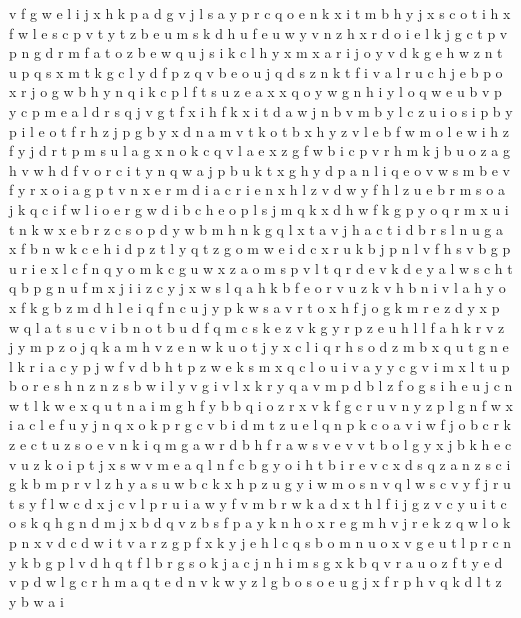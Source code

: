 \documentclass{article}
\begin{document}
v f g w e l i j x h k p a
d g v j l s a y p r c q o e n k x i t m b h
y j x s c o t i
h x f w l e s c p v t y
t z b e u m s k d
h u f e
u w y v n z h x r d o i e l k j g c t p
v p n g d r m f a t o z b e w q u j s i k c l h y x
m x a r i j o y v d k g e h w z n t u p q s
x m t k g c l y d f p z q v b e o u j
q d s z n k t f i v a l r u c h j e b p o x
r j o g w b h y n q i k c p l f t s u z e a x
x q o y w g n
h i y l o q w e u b v p
y c p m e a l d r s q j v g t f x i h
f k x i t d a w j n b v
m b y l c z u i o s
i p
b y p i
l e o t
f r h z j p g b y x d n a m v t
k o t b x h y z v l e
b f w m o
l
e w i h z f y j d r t p m s u l a g x n o k c q v
l a e x z g f w b i c p v r h m
k j b u o z a g h v w
h d f v o r c i t y n q w a j p b u
k t x g h y d p a n l i q e o v w s m b
e v f y r x o i a g
p t
v n x e r
m d i a c r
i e n x
h l z
v d w y f h l z u e b r m s o a j k q c i
f w l i o e
r g w d i b c h e o p l s j m q k x
d h w f k g p y o q r m x u i t
n k w x e b r
z c s o p d y w b m h n k g q l x t a
v j h a c t i d b r s l n u g
a x f b n w k c e h i d p z t l
y q t z g o m w e i d c x r u k b j p n l v f h s
v b g p u r i e x l c f n q y o m
k
c g u w x z a o m s p v l t q r d e
v k d e y a l w s c h t q b p g n u f m x j i
i z c y j x w s l q a h k b f e o r v u
z k v h b
n i v l a h y o x f k
g b z m d h l e i q f n c u j y p k w s a v r t o x
h f j o g k m r e z d y x p w q l a t s u c v i b n
o t b u d f q m c s k e
z
v k g y r p z e u h l
l f a h k r v z j y m
p z o j q k a m
h v z e n w k u o t j y x c l i q r
h s o d z m b x q u t g n e l k r i a c y p j w f v
d b h t p z w e k s m x q c l o u i v a y
y c g v i m x l t u p b o r e s h n z
n z s b w i l y v g
i
v l
x k r y q a v m p d b l z f o g s i h e u j c n w t
l k w e x q u t n a i m g h f y b
b q i o z r x v k f g c
r u v n y z p l
g n f w x i a c
l e f u y j n q x o k p r g c v b i d m t
z u e l q n p k c o a v
i w f j o b c r k z e
c t u z s o e v n k i q m g a w r d b h f
r a w s v e
v
v t b o
l g y x j b k h e c v
u z k o i p t j x s w v m e a q l n f c b g y
o
i h t
b i r e v c x d s q z a
n z s c i g k
b m p r v l z h y a s u w
b c k x h p z u g y i w m o s n v q l
w s c
v y f j r u t s
y f l
w c
d x j c v l p r u i a w y f
v m
b r w k a d x t h l f i j g z v c y
u i t c o s k q h g n d m j
x b
d q v z b s f p a y k n h o x r e g m
h v j r e k z q
w l o k p n x v d c
d w i t v a r z g p f x k y j e h l c q s b o m n u
o x v g e u t l p r c n y k b
g p l v d h
q t f l b r g s o k j a c
j n h i m s g x k b q v r a u o z f t y e d
v p d w l g c r
h m a q t e d n v k w y z l g b o
s o e u g j x f r p h v q k d l t z y b w a i
\end{document}

